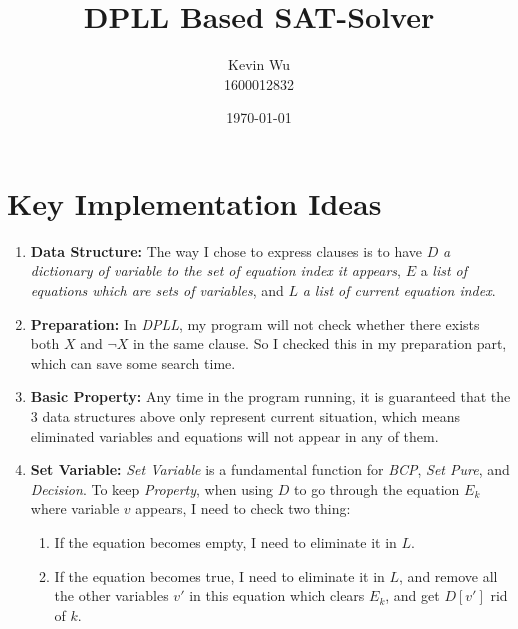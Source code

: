 \documentclass[a4paper,10pt]{article}
\title{DPLL Based SAT-Solver}
\author{Kevin Wu\\1600012832}
\date{\today}
\begin{document}
\maketitle
\vspace{-20pt}
\section{Key Implementation Ideas}
\begin{enumerate}
\setlength{\itemsep}{.1em}
\item \textbf{Data Structure:} The way I chose to express clauses is to have $D$  
    \textit{a dictionary of variable to the set of equation index it appears}, $E$ a 
    \textit{list of equations which are sets of variables}, and $L$ \textit{a list of current
    equation index}.
\item \textbf{Preparation:}
    In \textit{DPLL}, my program will not check whether there exists both $X$ and
    $\neg X$ in the same clause. So I checked this in my preparation part, which can
    save some search time.
\item \textbf{Basic Property:} Any time in the program running, it is guaranteed
    that the $3$ data structures above
    only represent current situation, which means eliminated variables and 
    equations will not appear in any of them.
\item \textbf{Set Variable:} \textit{Set Variable} is a fundamental function for \textit{BCP},
    \textit{Set Pure}, and \textit{Decision}.
    To keep \textit{Property}, when using $D$ to go through
    the equation $E_k$ where variable $v$ appears,
    I need to check two thing: 
    \begin{enumerate}
        \small\setlength{\itemsep}{.1em}
        \item If the equation becomes empty, I need to eliminate it in $L$.
        \item If the equation becomes true, I need to eliminate it in $L$,
            and remove all the other variables $v'$ in this equation which clears $E_k$,
            and get $D[v']$ rid of $k$.
    \end{enumerate}

\end{enumerate}
\end{document}
